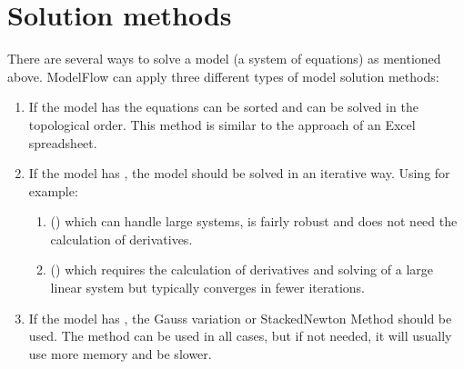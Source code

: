 \documentclass[letterpaper,10pt,english]{jupyterBook}
\begin{document}
\chapter{Solution methods}
\label{\detokenize{content/notebooks/intro/model and solution:solution-methods}}
\sphinxAtStartPar
There are several ways to solve a model (a system of equations) as mentioned above. ModelFlow can apply three different types of model solution methods:
\begin{enumerate}
%
\item {} 
\sphinxAtStartPar
If the model has  the equations can be sorted
 and can be solved in the topological order. This method is similar to the approach of an Excel spreadsheet.

\item {} 
\sphinxAtStartPar
If the model has , the model should be solved in an iterative way. Using for example:
\begin{enumerate}
%
\item {} 
\sphinxAtStartPar
{} () which can handle large systems, is fairly robust and does not need the calculation of derivatives.

\item {} 
\sphinxAtStartPar
{} () which requires the calculation of derivatives and solving of a large linear system but typically converges in fewer iterations.

\end{enumerate}

\item {} 
\sphinxAtStartPar
If the model has , the Gauss variation  or Stacked\sphinxhyphen{}Newton Method should be used. The  method can be used in all cases, but if not needed, it will usually use more memory and be slower.

\end{enumerate}
\end{document}
